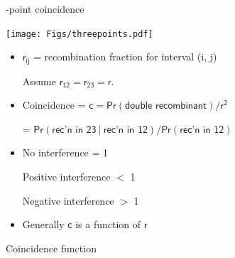 \documentclass[12pt]{article}
\newcommand{\headsize}{\fontsize{35}{35} \selectfont}
\newcommand{\smallersize}{\fontsize{20}{25} \selectfont}
\begin{document}
{\headsize \color{myyellow}
\hfill
\begin{minipage}{5.75in}
-point coincidence
\end{minipage}

\vspace*{1cm}

\hfill \begin{minipage}{9in}

\hspace{-0.5in} \texttt{[image: Figs/threepoints.pdf]}

\vspace{1cm}

\color{mywhite} \smallersize
\begin{itemize}
\itemsep24pt
\setlength{\rightskip}{0pt plus 1fil} %

\item $\mathsf{r_{ij}}$ = recombination fraction for interval (i, j)

{\color{myblue} Assume $\mathsf{r_{12} = r_{23} = r}$.}

\item {\color{mypink} Coincidence} = $\mathsf{c = Pr(\text{double
  recombinant}) / r^2}$

\hspace{20mm} {\color{myblue} = $\mathsf{Pr(\text{rec'n in 23} \ |
    \ \text{rec'n in 12}) /
  Pr(\text{rec'n in 12})}$}

\item
No interference { \color{myblue} = 1 }

Positive interference { \color{myblue} $<$ 1 }

Negative interference { \color{myblue} $>$ 1  }


\item Generally {\color{myblue} $\mathsf{c}$} is a function of
  {\color{myblue} $\mathsf{r}$}

\end{itemize}

\end{minipage} \hspace{0.25in}



\newpage


\headsize \color{myyellow}
\hfill \begin{minipage}{5.75in}
\centering
Coincidence function
\end{minipage}

}
\end{document}
